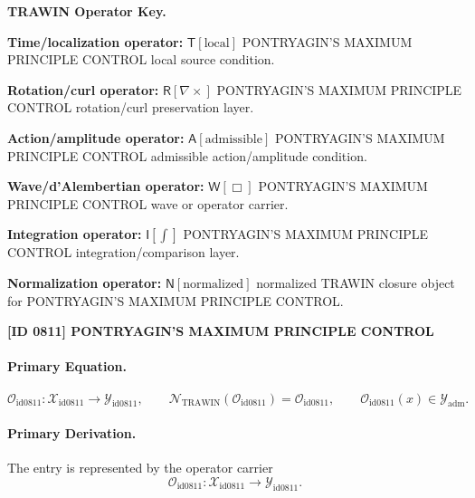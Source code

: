 \par\vspace{0.45\baselineskip}
\noindent\begin{minipage}[t]{\linewidth}
\begingroup
\small
\raggedright
\textbf{TRAWIN Operator Key.}\par
\noindent\textbf{Time/localization operator:} $\mathsf{T}\!\left[\mathrm{local}\right]$ PONTRYAGIN'S MAXIMUM PRINCIPLE CONTROL local source condition.\par
\noindent\textbf{Rotation/curl operator:} $\mathsf{R}\!\left[\nabla\times\right]$ PONTRYAGIN'S MAXIMUM PRINCIPLE CONTROL rotation/curl preservation layer.\par
\noindent\textbf{Action/amplitude operator:} $\mathsf{A}\!\left[\mathrm{admissible}\right]$ PONTRYAGIN'S MAXIMUM PRINCIPLE CONTROL admissible action/amplitude condition.\par
\noindent\textbf{Wave/d'Alembertian operator:} $\mathsf{W}\!\left[\Box\right]$ PONTRYAGIN'S MAXIMUM PRINCIPLE CONTROL wave or operator carrier.\par
\noindent\textbf{Integration operator:} $\mathsf{I}\!\left[\int\right]$ PONTRYAGIN'S MAXIMUM PRINCIPLE CONTROL integration/comparison layer.\par
\noindent\textbf{Normalization operator:} $\mathsf{N}\!\left[\mathrm{normalized}\right]$ normalized TRAWIN closure object for PONTRYAGIN'S MAXIMUM PRINCIPLE CONTROL.\par
\endgroup
\end{minipage}

\clearpage
\noindent\textbf{[ID 0811] PONTRYAGIN'S MAXIMUM PRINCIPLE CONTROL}\par
\vspace{0.35em}
\paragraph{Primary Equation.}
\[
\mathcal{O}_{\mathrm{id0811}}:\mathcal{X}_{\mathrm{id0811}}\longrightarrow \mathcal{Y}_{\mathrm{id0811}},\qquad
\mathcal{N}_{\mathrm{TRAWIN}}(\mathcal{O}_{\mathrm{id0811}})=\mathcal{O}_{\mathrm{id0811}},\qquad
\mathcal{O}_{\mathrm{id0811}}(x)\in\mathcal{Y}_{\mathrm{adm}}.
\]

\paragraph{Primary Derivation.} The entry is represented by the operator carrier\[
\mathcal{O}_{\mathrm{id0811}}:\mathcal{X}_{\mathrm{id0811}}\longrightarrow \mathcal{Y}_{\mathrm{id0811}}.
\]

